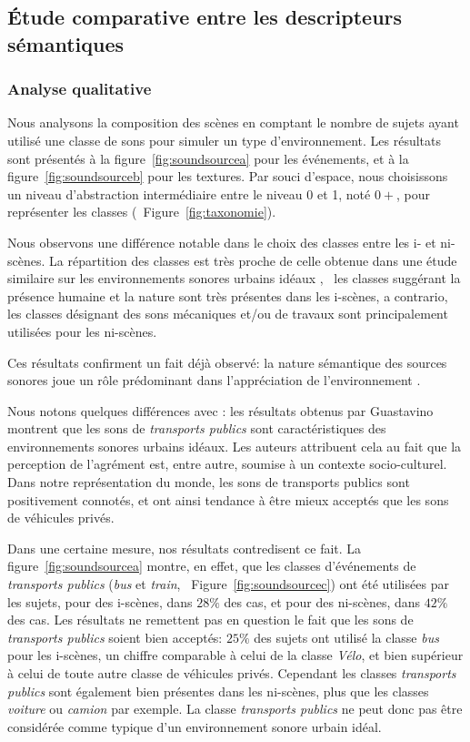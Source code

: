\subsection{Étude comparative entre les descripteurs sémantiques}

\subsubsection{Analyse qualitative}
\label{sec:ch5_anaQualiSem}

Nous analysons la composition des scènes en comptant le nombre de sujets ayant utilisé une classe de sons pour simuler un type d'environnement. Les résultats sont présentés à la figure~\ref{fig:soundsourcea} pour les événements, et à la figure~\ref{fig:soundsourceb} pour les textures. Par souci d'espace, nous choisissons un niveau d'abstraction intermédiaire entre le niveau 0 et 1, noté $0+$, pour représenter les classes (\cf~Figure~\ref{fig:taxonomie}).

Nous observons une différence notable dans le choix des classes entre les i- et ni-scènes. La répartition des classes est très proche de celle obtenue dans une étude similaire sur les environnements sonores urbains idéaux \citep{guastavino2006ideal}, \ie~les classes suggérant la présence humaine et la nature sont très présentes dans les i-scènes, a contrario, les classes désignant des sons mécaniques et/ou de travaux sont principalement utilisées pour les ni-scènes.

Ces résultats confirment un fait déjà observé: la nature sémantique des sources sonores joue un rôle prédominant dans l'appréciation de l'environnement \citep{raimbault2005urban,dubois2006cognitive}.

Nous notons quelques différences avec \citep{guastavino2006ideal}: les résultats obtenus par Guastavino montrent que les sons de \emph{transports publics} sont caractéristiques des environnements sonores urbains idéaux. Les auteurs attribuent cela au fait que la perception de l'agrément est, entre autre, soumise à un contexte socio-culturel. Dans notre représentation du monde, les sons de transports publics sont positivement connotés, et ont ainsi tendance à être mieux acceptés que les sons de véhicules privés.

Dans une certaine mesure, nos résultats contredisent ce fait. La figure~\ref{fig:soundsourcea} montre, en effet, que les classes d'événements de \emph{transports publics} (\emph{bus} et \emph{train}, \cf~Figure~\ref{fig:soundsourcec}) ont été utilisées par les sujets, pour des i-scènes, dans $28\%$ des cas, et pour des ni-scènes, dans $42\%$ des cas. Les résultats ne remettent pas en question le fait que les sons de \emph{transports publics} soient bien acceptés: $25\%$ des sujets ont utilisé la classe \emph{bus} pour les i-scènes, un chiffre comparable à celui de la classe \emph{Vélo}, et bien supérieur à celui de toute autre classe de véhicules privés. Cependant les classes \emph{transports publics} sont également bien présentes dans les ni-scènes, plus que les classes \emph{voiture} ou \emph{camion} par exemple. La classe \emph{transports publics} ne peut donc pas être considérée comme typique d'un environnement sonore urbain idéal.

